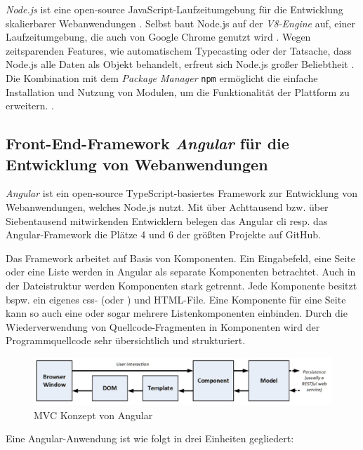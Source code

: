 \textit{Node.js} ist eine open-source JavaScript-Laufzeitumgebung für die Entwicklung skalierbarer Webanwendungen 
\cite{NodeJSWebsiteAbout}.
Selbst baut Node.js auf der \textit{V8-Engine} auf, einer Laufzeitumgebung, die auch von Google Chrome genutzt wird 
\cite[S. 1]{NodeJSRecepies}.
Wegen zeitsparenden Features, wie automatischem Typecasting oder der Tatsache, dass Node.js alle Daten als Objekt behandelt, erfreut sich Node.js großer Beliebtheit 
\cite[S. 12]{PracitalNodeJS}.
Die Kombination mit dem \textit{Package Manager} \texttt{npm} ermöglicht die einfache Installation und Nutzung von Modulen, um die Funktionalität der Plattform zu erweitern. 
\cite[S. 9]{NodeJSRecepies}.
%



\subsection{Front-End-Framework \textit{Angular} für die Entwicklung von Webanwendungen}
\textit{Angular} ist ein open-source TypeScript-basiertes Framework zur Entwicklung von Webanwendungen, welches Node.js nutzt.
Mit über Achttausend bzw. über Siebentausend mitwirkenden Entwicklern belegen das Angular \ac{cli} resp. das Angular-Framework die Plätze 4 und 6 der größten Projekte auf GitHub. 
\cite{OctoverseGitHubStatistics}

Das Framework arbeitet auf Basis von Komponenten. Ein Eingabefeld, eine Seite oder eine Liste werden in Angular als separate Komponenten betrachtet. Auch in der Dateistruktur werden Komponenten stark getrennt. Jede Komponente besitzt bspw. ein eigenes \acs{css}- (oder ) und HTML-File. Eine Komponente für eine Seite kann so auch eine oder sogar mehrere Listenkomponenten einbinden. Durch die Wiederverwendung von Quellcode-Fragmenten in Komponenten wird der Programmquellcode sehr übersichtlich und strukturiert.

\begin{figure}[h!]
	\includegraphics[width=\linewidth]{img/fig/2-4-3_Angular_MVC_Concept.jpg}
	\centering
	\caption{MVC Konzept von Angular \cite[S. 35, Abbildung 3-4]{ProAngular}}
	\label{fig:angularmvc}
\end{figure}
\newpage
Eine Angular-Anwendung ist wie folgt in drei Einheiten gegliedert:

